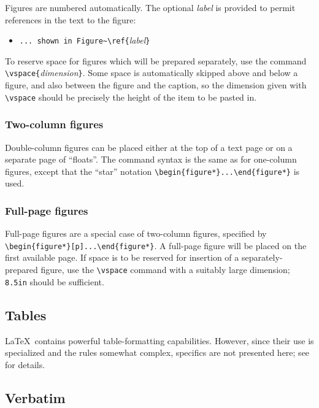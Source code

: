 Figures are numbered automatically.  The optional {\it label\/} is
provided to permit references in the text to the figure:
\begin{itemize}
\item[] \verb"... shown in Figure~\ref{"{\it label\/}\verb"}"
\end{itemize}

To reserve space for figures which will be prepared separately,
use the command \verb"\vspace{"{\it dimension\/}\verb"}".
Some space is automatically skipped above and below a figure, and also
between the figure and the caption, so the dimension given with
\verb"\vspace" should be precisely the height of the item to be pasted in.


\subsubsection{Two-column figures}

Double-column figures can be placed either at the top of a text
page or on a separate page of ``floats''.  The command syntax is the same
as for one-column figures, except that the ``star'' notation
\verb"\begin{figure*}...\end{figure*}" is used.


\subsubsection{Full-page figures}

Full-page figures are a special case of two-column figures,
specified by \verb"\begin{figure*}[p]...\end{figure*}".  A full-page
figure will be placed on the first available page.  If space is to
be reserved for insertion of a separately-prepared figure, use the
\verb"\vspace" command with a suitably large dimension; \verb"8.5in"
should be sufficient.


\subsection{Tables}

\LaTeX\ contains powerful table-formatting capabilities.  However, since
their use is specialized and the rules somewhat complex, specifics
are not presented here; see \cite{LT} for details.


\subsection{Verbatim}

